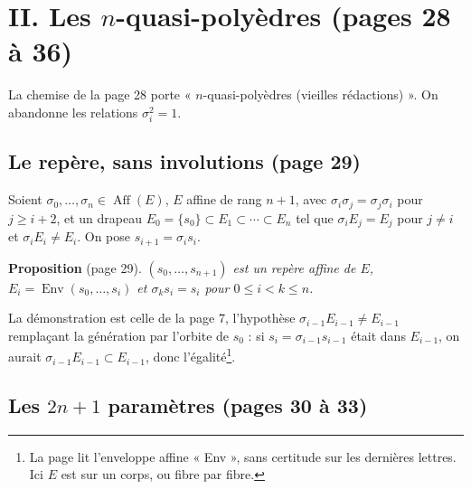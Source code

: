 \documentclass[11pt,a4paper]{article}
\begin{document}
\section*{II. Les $n$-quasi-polyèdres (pages 28 à 36)}

La chemise de la page 28 porte « $n$-quasi-polyèdres (vieilles rédactions) ».
On abandonne les relations $\sigma_i^2 = 1$.

\subsection*{Le repère, sans involutions (page 29)}

Soient $\sigma_0, \dots, \sigma_n \in \operatorname{Aff}(E)$, $E$ affine de rang
$n+1$, avec $\sigma_i\sigma_j = \sigma_j\sigma_i$ pour $j \geq i + 2$, et un
drapeau $E_0 = \{s_0\} \subset E_1 \subset \cdots \subset E_n$ tel que $\sigma_i
E_j = E_j$ pour $j \neq i$ et $\sigma_i E_i \neq E_i$. On pose $s_{i+1} =
\sigma_i s_i$.

\textbf{Proposition} (page 29). \emph{$(s_0, \dots, s_{n+1})$ est un repère
affine de $E$, $E_i = \operatorname{Env}(s_0, \dots, s_i)$ et $\sigma_k s_i = s_i$
pour $0 \leq i < k \leq n$.}

La démonstration est celle de la page 7, l'hypothèse $\sigma_{i-1}E_{i-1} \neq
E_{i-1}$ remplaçant la génération par l'orbite de $s_0$ : si $s_i =
\sigma_{i-1}s_{i-1}$ était dans $E_{i-1}$, on aurait $\sigma_{i-1}E_{i-1} \subset
E_{i-1}$, donc l'égalité\footnote{La page lit l'enveloppe affine « Env »,
sans certitude sur les dernières lettres. Ici $E$ est sur un corps, ou fibre
par fibre.}.

\subsection*{Les $2n + 1$ paramètres (pages 30 à 33)}
\end{document}
